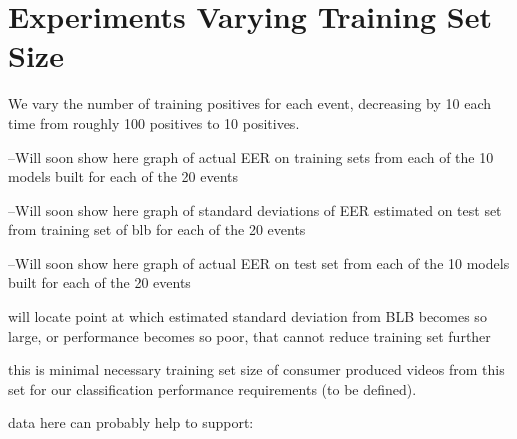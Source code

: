 \section{Experiments Varying Training Set Size}

We vary the number of training positives for each event, decreasing by 10 each time from roughly 100 positives to 10 positives. 

--Will soon show here graph of actual EER on training sets from each of the 10 models built for each of the 20 events 

--Will soon show here graph of standard deviations of EER estimated on test set from training set of blb for each of the 20 events

--Will soon show here graph of actual EER on test set from each of the 10 models built for each of the 20 events 

will locate point at which estimated standard deviation from BLB becomes so large, or performance becomes so poor, that cannot reduce training set further

this is minimal necessary training set size of consumer produced videos from this set for our classification performance requirements (to be defined).

data here can probably help to support: \cite{elizalde2012there}